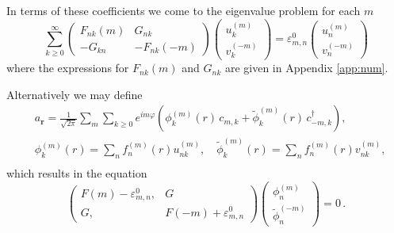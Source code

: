\documentclass[aps,prb,twocolumn,superscriptaddress,nobalancelastpage]{revtex4-1}
\begin{document}
 In terms of these coefficients 
 we come to the eigenvalue problem   for each $m$
\begin{equation}
\sum_{k\geq0}^{\infty}
 \begin{pmatrix}
F_{nk} (m)&G_{nk}\\
 - G_{kn} & - F_{nk} (-m)
 \end{pmatrix}
\begin{pmatrix}  u_k^{(m)}\\    v_k^{(-m)}  \end{pmatrix}  
 = \varepsilon^0_{m,n}  \begin{pmatrix}  u_n^{(m)}\\    v_n^{(-m)}  \end{pmatrix} 
\label{eq:numMatrixEq}
\end{equation}
where  the expressions for $F_{nk} (m)$ and $G_{nk}$ are given in Appendix  \ref{app:num}.   

Alternatively we may define 
\begin{equation}  
\begin{aligned}
&a _{\mathbf{r}} =  
\frac{1}{\sqrt{2 \pi}}   \sum_{m}  \sum\limits_{k\ge 0} e^{im\varphi } ( \phi_{k}^{(m)}( r )\, c_{m,k}  + 
{\tilde \phi}_{k}^{(m)}( r )\, c^{\dagger}_{-m,k} ), \\ 
 &\phi_{k}^{(m)}( r )  = \sum_{n} f_{n}^{(m)}( r ) u^{(m)}_{nk}  , \quad 
{\tilde \phi}_{k}^{(m)}( r )   = \sum_{n} f_{n}^{(m)}( r ) v^{(m)}_{nk} , \\ 
\end{aligned} 
\label{uvfunction}
\end{equation}
which results in the equation 
\begin{equation}
\begin{pmatrix} F( m )-  \varepsilon^0 _{m,n} ,&G \\ G,& F(  - m ) +\varepsilon^0 _{m,n} \end{pmatrix}
\begin{pmatrix} \phi_{n}^{(m)}\\ {\tilde \phi}_{n}^{(-m)} \end{pmatrix} = 0 \,.
\label{eq:ShrodEq}
\end{equation}
 

 

\end{document}
